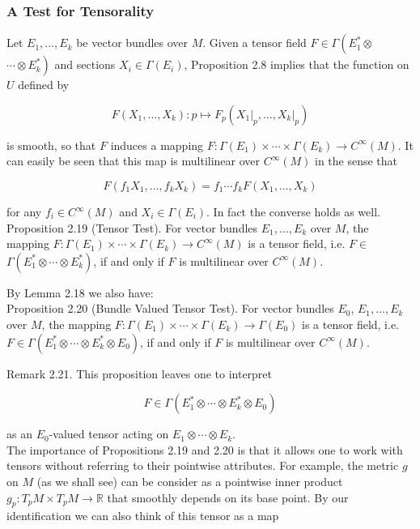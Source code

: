 \documentclass[10pt, letterpaper]{article}
\begin{document}
\subsubsection*{A Test for Tensorality}
Let $E_{1}, \ldots, E_{k}$ be vector bundles over $M$. Given a tensor field $F \in \Gamma\left(E_{1}^{*} \otimes\right.$ $\left.\cdots \otimes E_{k}^{*}\right)$ and sections $X_{i} \in \Gamma\left(E_{i}\right)$, Proposition 2.8 implies that the function on $U$ defined by

$$
F\left(X_{1}, \ldots, X_{k}\right): p \mapsto F_{p}\left(\left.X_{1}\right|_{p}, \ldots,\left.X_{k}\right|_{p}\right)
$$

is smooth, so that $F$ induces a mapping $F: \Gamma\left(E_{1}\right) \times \cdots \times \Gamma\left(E_{k}\right) \rightarrow C^{\infty}(M)$. It can easily be seen that this map is multilinear over $C^{\infty}(M)$ in the sense that

$$
F\left(f_{1} X_{1}, \ldots, f_{k} X_{k}\right)=f_{1} \cdots f_{k} F\left(X_{1}, \ldots, X_{k}\right)
$$

for any $f_{i} \in C^{\infty}(M)$ and $X_{i} \in \Gamma\left(E_{i}\right)$. In fact the converse holds as well.\\
Proposition 2.19 (Tensor Test). For vector bundles $E_{1}, \ldots, E_{k}$ over $M$, the mapping $F: \Gamma\left(E_{1}\right) \times \cdots \times \Gamma\left(E_{k}\right) \rightarrow C^{\infty}(M)$ is a tensor field, i.e. $F \in$ $\Gamma\left(E_{1}^{*} \otimes \cdots \otimes E_{k}^{*}\right)$, if and only if $F$ is multilinear over $C^{\infty}(M)$.

By Lemma 2.18 we also have:\\
Proposition 2.20 (Bundle Valued Tensor Test). For vector bundles $E_{0}$, $E_{1}, \ldots, E_{k}$ over $M$, the mapping $F: \Gamma\left(E_{1}\right) \times \cdots \times \Gamma\left(E_{k}\right) \rightarrow \Gamma\left(E_{0}\right)$ is a tensor field, i.e. $F \in \Gamma\left(E_{1}^{*} \otimes \cdots \otimes E_{k}^{*} \otimes E_{0}\right)$, if and only if $F$ is multilinear over $C^{\infty}(M)$.

Remark 2.21. This proposition leaves one to interpret

$$
F \in \Gamma\left(E_{1}^{*} \otimes \cdots \otimes E_{k}^{*} \otimes E_{0}\right)
$$

as an $E_{0}$-valued tensor acting on $E_{1} \otimes \cdots \otimes E_{k}$.\\
The importance of Propositions 2.19 and 2.20 is that it allows one to work with tensors without referring to their pointwise attributes. For example, the metric $g$ on $M$ (as we shall see) can be consider as a pointwise inner product $g_{p}: T_{p} M \times T_{p} M \rightarrow \mathbb{R}$ that smoothly depends on its base point. By our identification we can also think of this tensor as a map
\end{document}
